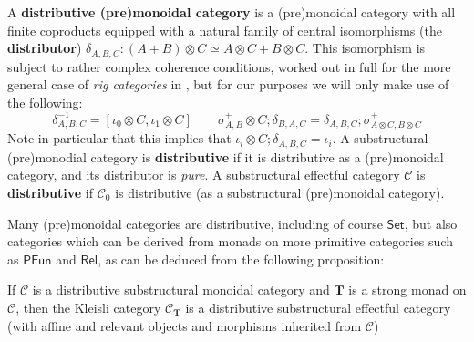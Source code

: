 \documentclass[acmsmall,screen,review]{acmart}
\newcommand{\mc}[1]{\ensuremath{\mathcal{#1}}}
\newcommand{\mb}[1]{\ensuremath{\mathbf{#1}}}
\newcommand{\ms}[1]{\ensuremath{\mathsf{#1}}}
\begin{document}
\begin{definition} 
  A \textbf{distributive (pre)monoidal category} is a (pre)monoidal category with all finite coproducts equipped with a natural family of central isomorphisms (the \textbf{distributor}) \(\delta_{A, B, C}: (A + B) \otimes C \simeq A \otimes C + B \otimes C\). This isomorphism is subject to rather complex coherence conditions, worked out in full for the more general case of \textit{rig categories} in \cite{laplaza-distributivity}, but for our purposes we will only make use of the following:
  \begin{equation*}
    \delta_{A, B, C}^{-1} = [\iota_0 \otimes C, \iota_1 \otimes C] 
    \qquad
    \sigma^+_{A, B} \otimes C;\delta_{B, A, C} = \delta_{A, B, C};\sigma^+_{A \otimes C, B \otimes C}
  \end{equation*}
  Note in particular that this implies that \(\iota_i \otimes C;\delta_{A, B, C} = \iota_i\). A substructural (pre)monodial category is \textbf{distributive} if it is distributive as a (pre)monoidal category, and its distributor is \textit{pure}. A substructural effectful category \(\mc{C}\) is \textbf{distributive} if \(\mc{C}_0\) is distributive (as a substructural (pre)monoidal category).
\end{definition}
Many (pre)monoidal categories are distributive, including of course \(\ms{Set}\), but also categories which can be derived from monads on more primitive categories such as \(\ms{PFun}\) and \(\ms{Rel}\), as can be deduced from the following proposition:
\begin{proposition}
  If \(\mc{C}\) is a distributive substructural monoidal category and \(\mb{T}\) is a strong monad on \(\mc{C}\), then the Kleisli category \(\mc{C}_{\mb{T}}\) is a distributive substructural effectful category (with affine and relevant objects and morphisms inherited from \(\mc{C}\))
\end{proposition}
\end{document}
